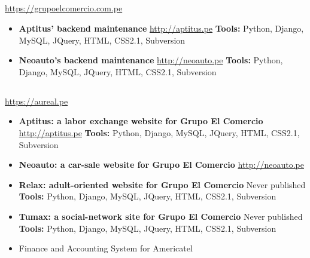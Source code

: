 \documentclass[11pt,a4paper,english]{moderncv}
\begin{document}
\subsection{}

{
\url{https://grupoelcomercio.com.pe}
\newline{}
\begin{itemize}
    \item \textbf{Aptitus' backend maintenance}
        \newline{}
        \url{http://aptitus.pe}
        \newline{}
        \textbf{Tools:} Python, Django, MySQL, JQuery, HTML, CSS2.1, Subversion
    \item \textbf{Neoauto's backend maintenance}
        \newline{}
        \url{http://neoauto.pe}
        \newline{}
        \textbf{Tools:} Python, Django, MySQL, JQuery, HTML, CSS2.1, Subversion
\end{itemize}
}

\subsection{}

{
\url{https://aureal.pe}
\newline{}
\begin{itemize}
    \item \textbf{Aptitus: a labor exchange website for Grupo El Comercio}
        \newline{}
        \url{http://aptitus.pe}
        \newline{}
        \textbf{Tools:} Python, Django, MySQL, JQuery, HTML, CSS2.1, Subversion
    \item \textbf{Neoauto: a car-sale website for Grupo El Comercio}
        \newline{}
        \url{http://neoauto.pe}
    \item \textbf{Relax: adult-oriented website for Grupo El Comercio}
        \newline{}
        Never published
        \newline{}
        \textbf{Tools:} Python, Django, MySQL, JQuery, HTML, CSS2.1, Subversion
    \item \textbf{Tumax: a social-network site for Grupo El Comercio}
        \newline{}
        Never published
        \newline{}
        \textbf{Tools:} Python, Django, MySQL, JQuery, HTML, CSS2.1, Subversion
    \item Finance and Accounting System for Americatel
\end{itemize}
}
\end{document}
